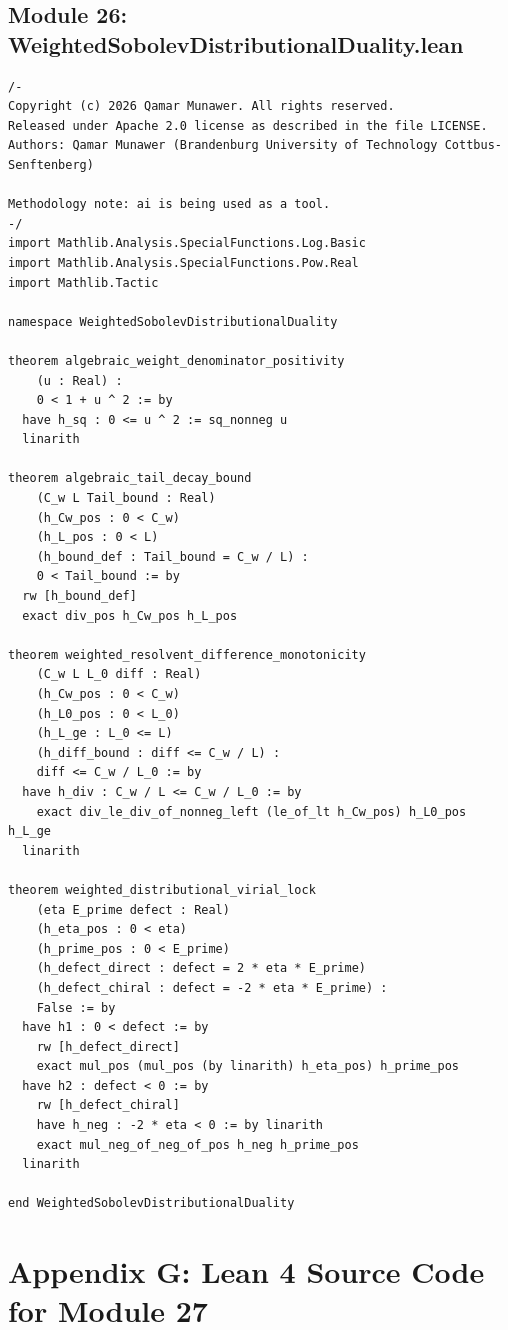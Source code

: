 \documentclass[11pt,a4paper]{article}
\begin{document}
\subsection*{Module 26: WeightedSobolevDistributionalDuality.lean}
\begin{lstlisting}[language=Lean4, caption={Weighted Sobolev Distributional Duality (Module 26)}]
/-
Copyright (c) 2026 Qamar Munawer. All rights reserved.
Released under Apache 2.0 license as described in the file LICENSE.
Authors: Qamar Munawer (Brandenburg University of Technology Cottbus-Senftenberg)

Methodology note: ai is being used as a tool.
-/
import Mathlib.Analysis.SpecialFunctions.Log.Basic
import Mathlib.Analysis.SpecialFunctions.Pow.Real
import Mathlib.Tactic

namespace WeightedSobolevDistributionalDuality

theorem algebraic_weight_denominator_positivity
    (u : Real) :
    0 < 1 + u ^ 2 := by
  have h_sq : 0 <= u ^ 2 := sq_nonneg u
  linarith

theorem algebraic_tail_decay_bound
    (C_w L Tail_bound : Real)
    (h_Cw_pos : 0 < C_w)
    (h_L_pos : 0 < L)
    (h_bound_def : Tail_bound = C_w / L) :
    0 < Tail_bound := by
  rw [h_bound_def]
  exact div_pos h_Cw_pos h_L_pos

theorem weighted_resolvent_difference_monotonicity
    (C_w L L_0 diff : Real)
    (h_Cw_pos : 0 < C_w)
    (h_L0_pos : 0 < L_0)
    (h_L_ge : L_0 <= L)
    (h_diff_bound : diff <= C_w / L) :
    diff <= C_w / L_0 := by
  have h_div : C_w / L <= C_w / L_0 := by
    exact div_le_div_of_nonneg_left (le_of_lt h_Cw_pos) h_L0_pos h_L_ge
  linarith

theorem weighted_distributional_virial_lock
    (eta E_prime defect : Real)
    (h_eta_pos : 0 < eta)
    (h_prime_pos : 0 < E_prime)
    (h_defect_direct : defect = 2 * eta * E_prime)
    (h_defect_chiral : defect = -2 * eta * E_prime) :
    False := by
  have h1 : 0 < defect := by
    rw [h_defect_direct]
    exact mul_pos (mul_pos (by linarith) h_eta_pos) h_prime_pos
  have h2 : defect < 0 := by
    rw [h_defect_chiral]
    have h_neg : -2 * eta < 0 := by linarith
    exact mul_neg_of_neg_of_pos h_neg h_prime_pos
  linarith

end WeightedSobolevDistributionalDuality
\end{lstlisting}


\newpage
\section*{Appendix G: Lean 4 Source Code for Module 27}
\end{document}
